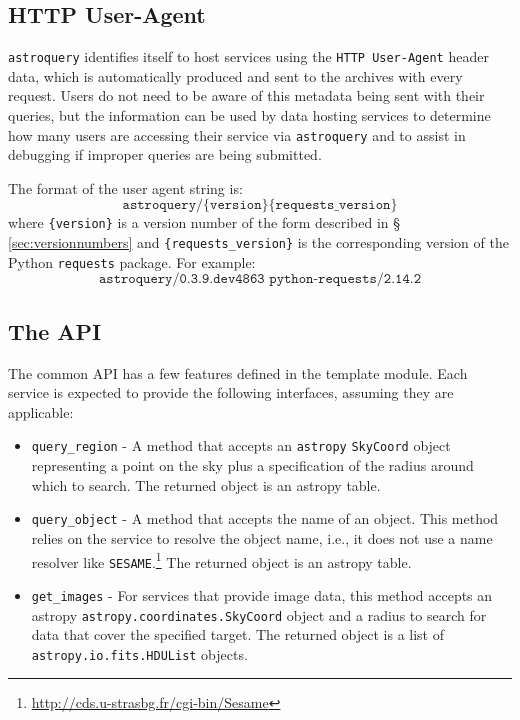 \documentclass[twocolumn]{aastex62}
\newcommand{\package}[1]{\texttt{#1}\xspace}
\newcommand{\astroquery}{\package{astroquery}}
\newcommand{\astropypkg}{\package{astropy}}
\begin{document}
\subsection{HTTP User-Agent}
\label{sec:useragent}
\astroquery identifies itself to host services using the \texttt{HTTP
User-Agent} header data, which is automatically produced and sent to the
archives with every request.
Users do not need to be aware of this metadata being sent with their
queries, but the information can be used by data hosting services to determine
how many users are accessing their service via \astroquery and to assist in
debugging if improper queries are being submitted.

The format of the user agent string is:
\[\texttt{astroquery/\{version\} \{requests\_version\}}\] where
\texttt{\{version\}} is a version number of the form described in \S
\ref{sec:versionnumbers} and \texttt{\{requests\_version\}} is the
corresponding version of the Python \package{requests} package. For example:
\[\texttt{astroquery/0.3.9.dev4863 python-requests/2.14.2}\]


\subsection{The API}
The common API has a few features defined in the template module.
Each service is expected to provide the following interfaces, assuming they are
applicable:

\begin{itemize}
    \item \texttt{query\_region} - A method that accepts an \astropypkg
        \texttt{SkyCoord} object representing a point on the sky plus a
        specification of the radius around which to search.
        The returned object is an astropy table.
    \item \texttt{query\_object} - A method that accepts the name of an
        object.  This method relies on the service to resolve the object name, i.e., it does not use a name resolver
        like \texttt{SESAME}.\footnote{\url{http://cds.u-strasbg.fr/cgi-bin/Sesame}}
        The returned object is an astropy table.
    \item \texttt{get\_images} - For services that provide image data, this
        method accepts an astropy \texttt{astropy.coordinates.SkyCoord} object
        and a radius to search for data that cover the specified target. The
        returned object is a list of \texttt{astropy.io.fits.HDUList} objects.

\end{itemize}
\end{document}
